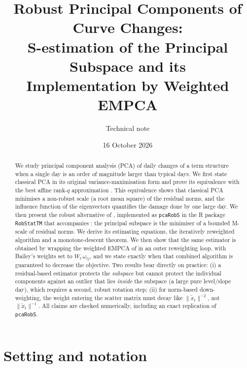 \documentclass[11pt]{article}
\title{Robust Principal Components of Curve Changes:\\
S-estimation of the Principal Subspace and its\\ Implementation by Weighted EMPCA}
\author{Technical note}
\date{16 October 2026}
\theoremstyle{definition}
\theoremstyle{remark}
\newcommand{\norm}[1]{\lVert #1\rVert}
\newcommand{\tx}{\tilde{x}}
\begin{document}
\maketitle

\begin{abstract}
We study principal component analysis (PCA) of daily changes of a term structure when a
single day is an order of magnitude larger than typical days.
We first state classical PCA in its original variance-maximisation form \citep{Hotelling1933}
and prove its equivalence with the best affine rank-$q$ approximation
\citep{Pearson1901,EckartYoung1936}. This equivalence shows that classical PCA minimises a
non-robust scale (a root mean square) of the residual norms, and the influence function
of the eigenvectors \citep{Critchley1985} quantifies the damage done by one large day.
We then present the robust alternative of \citet{Maronna2005}, implemented as
\texttt{pcaRobS} in the \textsf{R} package \texttt{RobStatTM} that accompanies
\citet{MaronnaEtAl2019}: the principal subspace is the minimiser of a bounded
M-scale of residual norms. We derive its estimating equations, the iteratively
reweighted algorithm and a monotone-descent theorem. We then show that the same estimator is
obtained by wrapping the weighted EMPCA of \citet{Bailey2012} in an outer reweighting loop,
with Bailey's weights set to $W_t\,\omega_{tj}$, and we state exactly when that combined
algorithm is guaranteed to decrease the objective. Two results bear directly on
practice: (i) a residual-based estimator protects the \emph{subspace} but cannot protect the
individual components against an outlier that lies \emph{inside} the subspace (a large pure
level/slope day), which requires a second, robust rotation step; (ii) for norm-based
down-weighting, the weight entering the scatter matrix must decay like $\norm{\tx_t}^{-2}$, not
$\norm{\tx_t}^{-1}$. All claims are checked numerically, including an exact replication of
\texttt{pcaRobS}.
\end{abstract}

\tableofcontents

\section{Setting and notation}\label{sec:setting}
\end{document}
